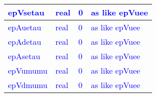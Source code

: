 \documentclass{article}
\begin{document}
\begin{longtable}{llll}
\midrule
\textcolor{blue}{epVsetau} & \begin{minipage}[t]{2cm}\textcolor{blue}{real}\end{minipage} & \begin{minipage}[t]{2cm}\textcolor{blue}{0}\end{minipage} & \begin{minipage}[t]{12cm}\textcolor{blue}{as like epVuee}\end{minipage}\\*
\midrule
\textcolor{blue}{epAuetau} & \begin{minipage}[t]{2cm}\textcolor{blue}{real}\end{minipage} & \begin{minipage}[t]{2cm}\textcolor{blue}{0}\end{minipage} & \begin{minipage}[t]{12cm}\textcolor{blue}{as like epVuee}\end{minipage}\\*
\midrule
\textcolor{blue}{epAdetau} & \begin{minipage}[t]{2cm}\textcolor{blue}{real}\end{minipage} & \begin{minipage}[t]{2cm}\textcolor{blue}{0}\end{minipage} & \begin{minipage}[t]{12cm}\textcolor{blue}{as like epVuee}\end{minipage}\\*
\midrule
\textcolor{blue}{epAsetau} & \begin{minipage}[t]{2cm}\textcolor{blue}{real}\end{minipage} & \begin{minipage}[t]{2cm}\textcolor{blue}{0}\end{minipage} & \begin{minipage}[t]{12cm}\textcolor{blue}{as like epVuee}\end{minipage}\\*
\midrule
\textcolor{blue}{epVumumu} & \begin{minipage}[t]{2cm}\textcolor{blue}{real}\end{minipage} & \begin{minipage}[t]{2cm}\textcolor{blue}{0}\end{minipage} & \begin{minipage}[t]{12cm}\textcolor{blue}{as like epVuee}\end{minipage}\\*
\midrule
\textcolor{blue}{epVdmumu} & \begin{minipage}[t]{2cm}\textcolor{blue}{real}\end{minipage} & \begin{minipage}[t]{2cm}\textcolor{blue}{0}\end{minipage} & \begin{minipage}[t]{12cm}\textcolor{blue}{as like epVuee}\end{minipage}\\*

\end{longtable}
\end{document}
